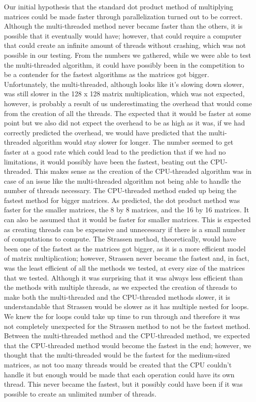 \documentclass[conference]{IEEEtran}
\begin{document}
    Our initial hypothesis that the standard dot product method of multiplying matrices could be made faster through parallelization turned out to be correct. Although the multi-threaded method never became faster than the others, it is possible that it eventually would have; however, that could require a computer that could create an infinite amount of threads without crashing, which was not possible in our testing. From the numbers we gathered, while we were able to test the multi-threaded algorithm, it could have possibly been in the competition to be a contender for the fastest algorithms as the matrices got bigger. Unfortunately, the multi-threaded, although looks like it's slowing down slower, was still slower in the 128 x 128 matrix multiplication, which was not expected, however, is probably a result of us underestimating the overhead that would come from the creation of all the threads. The expected that it would be faster at some point but we also did not expect the overhead to be as high as it was, if we had correctly predicted the overhead, we would have predicted that the multi-threaded algorithm would stay slower for longer. The number seemed to get faster at a good rate which could lead to the prediction that if we had no limitations, it would possibly have been the fastest, beating out the CPU-threaded. This makes sense as the creation of the CPU-threaded algorithm was in case of an issue like the multi-threaded algorithm not being able to handle the number of threads necessary. The CPU-threaded method ended up being the fastest method for bigger matrices. As predicted, the dot product method was faster for the smaller matrices, the 8 by 8 matrices, and the 16 by 16 matrices. It can also be assumed that it would be faster for smaller matrices. This is expected as creating threads can be expensive and unnecessary if there is a small number of computations to compute. The Strassen method, theoretically, would have been one of the fastest as the matrices got bigger, as it is a more efficient model of matrix multiplication; however, Strassen never became the fastest and, in fact, was the least efficient of all the methods we tested, at every size of the matrices that we tested. Although it was surprising that it was always less efficient than the methods with multiple threads, as we expected the creation of threads to make both the multi-threaded and the CPU-threaded methods slower, it is understandable that Strassen would be slower as it has multiple nested for loops. We knew the for loops could take up time to run through and therefore it was not completely unexpected for the Strassen method to not be the fastest method. Between the multi-threaded method and the CPU-threaded method, we expected that the CPU-threaded method would become the fastest in the end; however, we thought that the multi-threaded would be the fastest for the medium-sized matrices, as not too many threads would be created that the CPU couldn't handle it but enough would be made that each operation could have its own thread. This never became the fastest, but it possibly could have been if it was possible to create an unlimited number of threads.  
\end{document}
